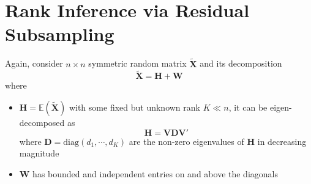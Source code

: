 \documentclass[twoside]{article}
\begin{document}
\section{Rank Inference via Residual Subsampling}
Again, consider $n\times n$ symmetric random matrix $\tilde{\mathbf{X}}$ and its decomposition 
\begin{equation*}
    \tilde{\mathbf{X}} = \mathbf{H+W}
\end{equation*}
where
\begin{itemize}
    \item $\mathbf{H} = \mathbb{E}\left(\tilde{\mathbf{X}}\right)$ with some fixed but unknown rank $K \ll n$, it can be eigen-decomposed as $$ \mathbf{H} = \mathbf{VDV}' $$ where $\mathbf{D} = \mathrm{diag}(d_1,\cdots,d_K)$ are the non-zero eigenvalues of $\mathbf{H}$ in decreasing magnitude 
    \item $\mathbf{W}$ has bounded and independent entries on and above the diagonals
\end{itemize}

\newpage


\end{document}
